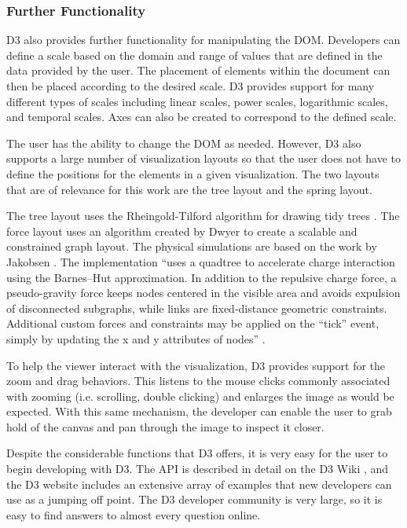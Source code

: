 \subsubsection{Further Functionality}

D3 also provides further functionality for manipulating the DOM. Developers can define a scale based on the domain and range of values that are defined in the data provided by the user. The placement of elements within the document can then be placed according to the desired scale. D3 provides support for many different types of scales including linear scales, power scales, logarithmic scales, and temporal scales. Axes can also be created to correspond to the defined scale.

The user has the ability to change the DOM as needed. However, D3 also supports a large number of visualization layouts so that the user does not have to define the positions for the elements in a given visualization. The two layouts that are of relevance for this work are the tree layout and the spring layout.

The tree layout uses the Rheingold-Tilford algorithm for drawing tidy trees \cite{Reingold81}. The force layout uses an algorithm created by Dwyer \cite{Dwyer2009} to create a scalable and constrained graph layout. The physical simulations are based on the work by Jakobsen \cite{Jakobsen03}. The implementation ``uses a quadtree to accelerate charge interaction using the Barnes–Hut approximation. In addition to the repulsive charge force, a pseudo-gravity force keeps nodes centered in the visible area and avoids expulsion of disconnected subgraphs, while links are fixed-distance geometric constraints. Additional custom forces and constraints may be applied on the ``tick'' event, simply by updating the x and y attributes of nodes'' \cite{D3Wiki}.

To help the viewer interact with the visualization, D3 provides support for the zoom and drag behaviors. This listens to the mouse clicks commonly associated with zooming (i.e. scrolling, double clicking) and enlarges the image as would be expected. With this same mechanism, the developer can enable the user to grab hold of the canvas and pan through the image to inspect it closer.

Despite the considerable functions that D3 offers, it is very easy for the user to begin developing with D3. The API is described in detail on the D3 Wiki \cite{D3Wiki}, and the D3 website \cite{D3} includes an extensive array of examples that new developers can use as a jumping off point. The D3 developer community is very large, so it is easy to find answers to almost every question online. 